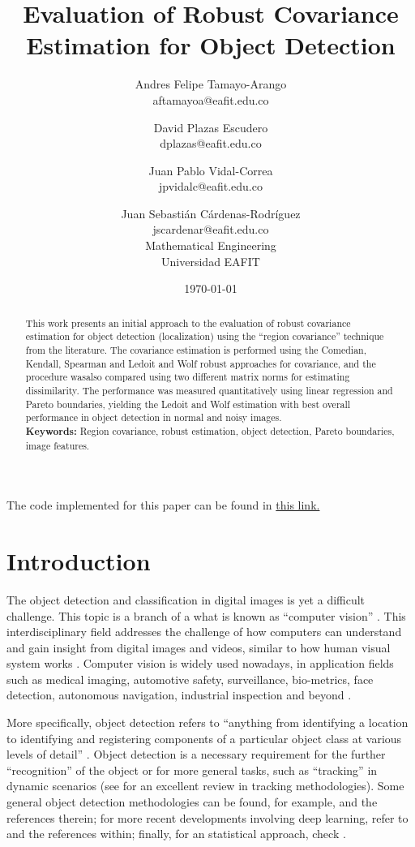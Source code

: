 \documentclass[11pt]{article}
\title{Evaluation of Robust Covariance Estimation for Object Detection}
\author{Andres Felipe Tamayo-Arango \\
  aftamayoa@eafit.edu.co \and
  David Plazas Escudero \\
  dplazas@eafit.edu.co \and
  Juan Pablo Vidal-Correa \\
  jpvidalc@eafit.edu.co \and
  Juan Sebasti\'an C\'ardenas-Rodríguez \\
  jscardenar@eafit.edu.co \\[0.5cm]
  Mathematical Engineering \\
  Universidad EAFIT}
\date{\today}
\theoremstyle{definition}
\theoremstyle{remark}
\theoremstyle{remark}
\theoremstyle{remark}
\begin{document}
\maketitle

\begin{abstract}
  \noindent This work presents an initial approach to the evaluation of robust
  covariance estimation for object detection (localization) using the
  ``region covariance'' technique from the literature. The covariance
  estimation is performed using the Comedian, Kendall, Spearman and Ledoit and
  Wolf robust approaches for covariance, and the procedure wasalso compared
  using two different matrix norms for estimating dissimilarity. The
  performance was measured quantitatively using linear regression and Pareto
  boundaries, yielding the Ledoit and Wolf estimation with best overall
  performance in object detection in normal and noisy images.\\[3mm]
  \noindent \textbf{Keywords:} Region covariance, robust estimation, object
  detection, Pareto boundaries, image features.
\end{abstract}

The code implemented for this paper can be found in
\href{https://bit.ly/3rQbVRQ}{this link.}

\section{Introduction}\label{sec_int}
The object detection and classification in digital images is yet a difficult
challenge. This topic is a branch of a what is known as ``computer vision''
\parencite{amit20022d}. This interdisciplinary field addresses the challenge of
how computers can understand and gain insight from digital images and videos,
similar to how human visual system works
\parencite{ballard1982computer,huang1996computer,amit20022d,szeliski2010computer}.
Computer vision is widely used nowadays, in application fields such as medical
imaging, automotive safety, surveillance, bio-metrics, face detection,
autonomous navigation, industrial inspection and beyond
\parencite{huang1996computer,szeliski2010computer}.

More specifically, object detection refers to ``anything from identifying a
location to identifying and registering components of a particular object class
at various levels of detail'' \parencite{amit20022d}. Object detection is a
necessary requirement for the further ``recognition'' of the object or for more
general tasks, such as ``tracking'' in dynamic scenarios (see
\parencite{li2013survey} for an excellent review in tracking methodologies).
Some general object detection methodologies can be found, for example,
\parencite{amit20022d,szeliski2010computer} and the references therein; for more
recent developments involving deep learning, refer to
\parencite{jiang2018deep,zhao2019object} and the references within; finally, for
an statistical approach, check \cite{li2015feature}.
\end{document}
